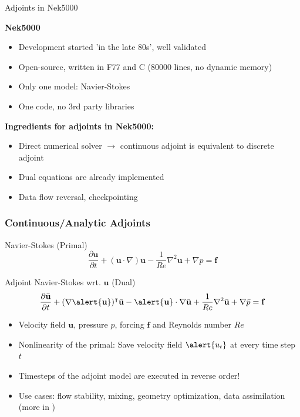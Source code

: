 \begin{frame}{Adjoints in Nek5000}

  {\bf Nek5000}

  \begin{itemize}
    \item Development started 'in the late 80s', well validated
    \item Open-source, written in F77 and C (80000 lines, no dynamic memory)
    \item Only one model: Navier-Stokes
    \item One code, no 3rd party libraries
  \end{itemize}
  {\bf Ingredients for adjoints in Nek5000:}
  \begin{itemize}
    \item Direct numerical solver $\rightarrow$ continuous adjoint is equivalent
      to discrete adjoint
    \item Dual equations are already implemented
    \item \alert{Data flow reversal, checkpointing}
  \end{itemize}
\end{frame}


\begin{frame}[fragile]
  \frametitle{Continuous/Analytic Adjoints}
  \begin{block}{Navier-Stokes (Primal)}
    $$
    \dfrac{\partial \mathbf{u}}{\partial{t}}+(\mathbf{u} \cdot
    \nabla)\mathbf{u}-\dfrac{1}{Re} \nabla^2 \mathbf{u}+\nabla{p}=\mathbf{f}
    $$
  \end{block}
  \begin{block}{Adjoint Navier-Stokes wrt. $\mathbf{u}$ (Dual)}
    $$
    \dfrac{\partial
    \bar{\mathbf{u}}}{\partial{t}}+(\mathbf{\nabla{\alert{u}}})^{\intercal}\bar{\mathbf{u}} -
    \mathbf{\alert{u}}\cdot \nabla{\bar{\mathbf{u}}}
    +\dfrac{1}{Re} \nabla^2 \bar{\mathbf{u}}+\nabla{\bar{p}}=\mathbf{f}
    $$
  \end{block}
  \begin{itemize}
    \item Velocity field $\mathbf{u}$, pressure $p$, forcing $\mathbf{f}$ and Reynolds
      number $Re$
    \item Nonlinearity of the primal: Save velocity field $\alert{u_t}$ at every time step $t$
    \item Timesteps of the adjoint model are executed in reverse order!
    \item Use cases: flow stability, mixing, geometry optimization, data assimilation
      (more in \cite{nekcontadjoints})
  \end{itemize}
\end{frame}



